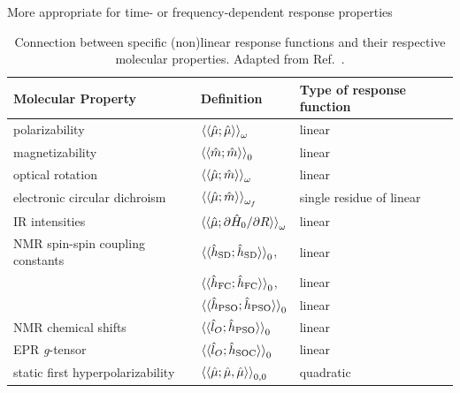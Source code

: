 \documentclass[%
class = book,%
crop = false,%
float = true,%
multi = true,%
preview = false,%
]{standalone}
\begin{document}
More appropriate for time- or frequency-dependent response properties

\begin{table}
  \centering
  \caption[Connection between response functions and molecular properties]{Connection between specific (non)linear response functions and their respective molecular properties. Adapted from Ref.~\parencite{C1CP21951K}.\label{tab:norman}}
  \begin{tabular}{lll}
    \toprule
    \textbf{Molecular Property}       & \textbf{Definition}                                                                    & \textbf{Type of response function} \\
    \midrule
    polarizability                    & \( \braket{\braket{\hat{\mu};\hat{\mu}}}_{\omega} \)                                   & linear \\
    magnetizability                   & \( \braket{\braket{\hat{m};\hat{m}}}_{0} \)                                            & linear \\
    optical rotation                  & \( \braket{\braket{\hat{\mu};\hat{m}}}_{\omega} \)                                     & linear \\
    electronic circular dichroism     & \( \braket{\braket{\hat{\mu};\hat{m}}}_{\omega_{f}} \)                                 & single residue of linear \\
    IR intensities                    & \( \braket{\braket{\hat{\mu};\partial\hat{H}_{0}/\partial R}}_{\omega} \)              & linear \\
    NMR spin-spin coupling constants  & \( \braket{\braket{\hat{h}_{\text{SD}};\hat{h}_{\text{SD}}}}_{0} \),                   & linear \\
                                      & \( \braket{\braket{\hat{h}_{\text{FC}};\hat{h}_{\text{FC}}}}_{0} \),                   & linear \\
                                      & \( \braket{\braket{\hat{h}_{\text{PSO}};\hat{h}_{\text{PSO}}}}_{0} \)                  & linear \\
    NMR chemical shifts               & \( \braket{\braket{\hat{l}_{O};\hat{h}_{\text{PSO}}}}_{0} \)                           & linear \\
    EPR \textit{g}-tensor             & \( \braket{\braket{\hat{l}_{O};\hat{h}_{\text{SOC}}}}_{0} \)                           & linear \\
    \midrule
    static first hyperpolarizability  & \( \braket{\braket{\hat{\mu};\hat{\mu},\hat{\mu}}}_{0,0} \)                            & quadratic \\

\end{tabular}
\end{table}
\end{document}

